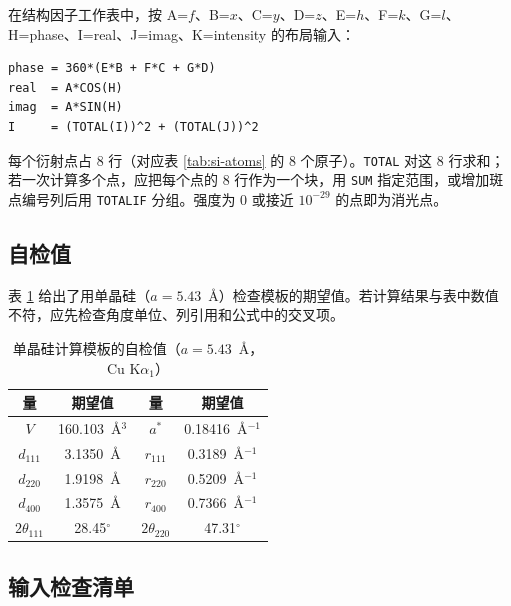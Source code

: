 在结构因子工作表中，按 A=$f$、B=$x$、C=$y$、D=$z$、E=$h$、F=$k$、G=$l$、H=phase、I=real、J=imag、K=intensity 的布局输入：
\begin{lstlisting}
phase = 360*(E*B + F*C + G*D)
real  = A*COS(H)
imag  = A*SIN(H)
I     = (TOTAL(I))^2 + (TOTAL(J))^2
\end{lstlisting}
每个衍射点占 8 行（对应表 \ref{tab:si-atoms} 的 8 个原子）。\texttt{TOTAL} 对这 8 行求和；若一次计算多个点，应把每个点的 8 行作为一个块，用 \texttt{SUM} 指定范围，或增加斑点编号列后用 \texttt{TOTALIF} 分组。强度为 0 或接近 $10^{-29}$ 的点即为消光点。

\subsection{自检值}

表 \ref{tab:self-check} 给出了用单晶硅（$a=5.43$~\AA）检查模板的期望值。若计算结果与表中数值不符，应先检查角度单位、列引用和公式中的交叉项。

\begin{table}[H]
  \centering
  \caption{单晶硅计算模板的自检值（$a=5.43$~\AA，Cu K$\alpha_1$）}
  \label{tab:self-check}
  \small
  \begin{tabular}{cccc}
    \toprule
    量 & 期望值 & 量 & 期望值 \\
    \midrule
    $V$ & 160.103~\AA$^3$ & $a^*$ & 0.18416~\AA$^{-1}$ \\
    $d_{111}$ & 3.1350~\AA & $r_{111}$ & 0.3189~\AA$^{-1}$ \\
    $d_{220}$ & 1.9198~\AA & $r_{220}$ & 0.5209~\AA$^{-1}$ \\
    $d_{400}$ & 1.3575~\AA & $r_{400}$ & 0.7366~\AA$^{-1}$ \\
    $2\theta_{111}$ & 28.45$^\circ$ & $2\theta_{220}$ & 47.31$^\circ$ \\
    \bottomrule
  \end{tabular}
\end{table}

\subsection{输入检查清单}

